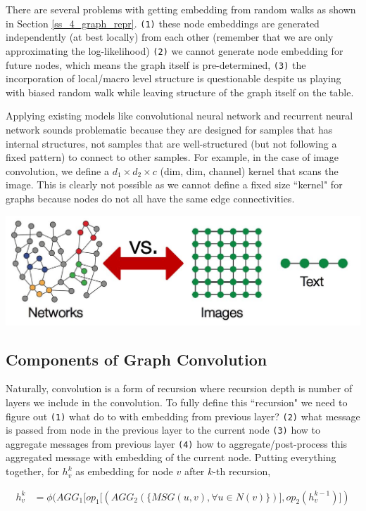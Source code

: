 There are several problems with getting embedding from random walks as shown in Section \ref{ss_4_graph_repr}. \texttt{(1)} these node embeddings are generated independently (at best locally) from each other (remember that we are only approximating the log-likelihood) \texttt{(2)} we cannot generate node embedding for future nodes, which means the graph itself is pre-determined, \texttt{(3)} the incorporation of local/macro level structure is questionable despite us playing with biased random walk while leaving structure of the graph itself on the table.

Applying existing models like convolutional neural network and recurrent neural network sounds problematic because they are designed for samples that has internal structures, not samples that are well-structured (but not following a fixed pattern) to connect to other samples. For example, in the case of image convolution, we define a $d_1 \times d_2 \times c$ (dim, dim, channel) kernel that scans the image. This is clearly not possible as we cannot define a fixed size ``kernel" for graphs because nodes do not all have the same edge connectivities. 

{
\centering
\includegraphics[width=0.75\linewidth]{notes/img/l8_p12_compare.JPG} \par
}

\subsection{Components of Graph Convolution}

Naturally, convolution is a form of recursion where recursion depth is number of layers we include in the convolution. To fully define this ``recursion" we need to figure out \texttt{(1)} what do to with embedding from previous layer? \texttt{(2)} what message is passed from node in the previous layer to the current node \texttt{(3)} how to aggregate messages from previous layer \texttt{(4)} how to aggregate/post-process this aggregated message with embedding of the current node. Putting everything together, for $h_v^k$ as embedding for node $v$ after $k$-th recursion,

\begin{align}
    h_v^k &= \phi(AGG_1\Big[ op_1\big[(AGG_2(\{MSG(u, v), \forall u\in N(v)\})\big], op_2(h_v^{k-1})  \Big])
\end{align}{}


